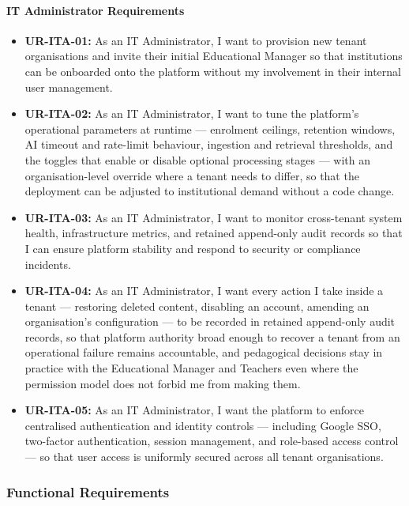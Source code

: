 \paragraph{IT Administrator Requirements}
\begin{itemize}
    \item \textbf{UR-ITA-01:} As an IT Administrator, I want to provision new tenant organisations and invite their initial Educational Manager so that institutions can be onboarded onto the platform without my involvement in their internal user management.
    \item \textbf{UR-ITA-02:} As an IT Administrator, I want to tune the platform's operational parameters at runtime --- enrolment ceilings, retention windows, AI timeout and rate-limit behaviour, ingestion and retrieval thresholds, and the toggles that enable or disable optional processing stages --- with an organisation-level override where a tenant needs to differ, so that the deployment can be adjusted to institutional demand without a code change.
    \item \textbf{UR-ITA-03:} As an IT Administrator, I want to monitor cross-tenant system health, infrastructure metrics, and retained append-only audit records so that I can ensure platform stability and respond to security or compliance incidents.
    \item \textbf{UR-ITA-04:} As an IT Administrator, I want every action I take inside a tenant --- restoring deleted content, disabling an account, amending an organisation's configuration --- to be recorded in retained append-only audit records, so that platform authority broad enough to recover a tenant from an operational failure remains accountable, and pedagogical decisions stay in practice with the Educational Manager and Teachers even where the permission model does not forbid me from making them.
    \item \textbf{UR-ITA-05:} As an IT Administrator, I want the platform to enforce centralised authentication and identity controls --- including Google SSO, two-factor authentication, session management, and role-based access control --- so that user access is uniformly secured across all tenant organisations.

\end{itemize}
\subsubsection{Functional Requirements}

